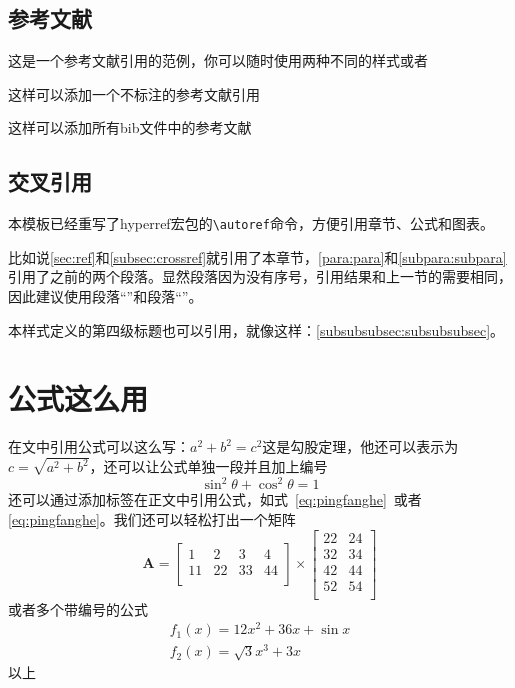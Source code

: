 \documentclass[supercite,gbtcite]{HustGraduPaper}
\begin{document}
	\subsection{参考文献}
	这是一个参考文献引用的范例\cite{Stone_1998}，你可以随时使用两种不同的样式或者\supercite{Stone_1998}
	
	这样可以添加一个不标注的参考文献引用\nocite{9787508342894}
	
	这样可以添加所有bib文件中的参考文献\nocite{*}
	
	\subsection{交叉引用}\label{subsec:crossref}
	本模板已经重写了hyperref宏包的\verb|\autoref|命令，方便引用章节、公式和图表。
	
	比如说\autoref{sec:ref}和\autoref{subsec:crossref}就引用了本章节，\autoref{para:para}和\autoref{subpara:subpara}引用了之前的两个段落。显然段落因为没有序号，引用结果和上一节的需要相同，因此建议使用段落“”和段落“”。
	
	本样式定义的第四级标题也可以引用，就像这样：\autoref{subsubsubsec:subsubsubsec}。
	
	
	
	\section{公式这么用}
	在文中引用公式可以这么写：$a^2+b^2=c^2$这是勾股定理，他还可以表示为$c=\sqrt{a^2+b^2}$，还可以让公式单独一段并且加上编号
	\begin{equation}
	\sin^2{\theta}+\cos^2{\theta}=1 \label{eq:pingfanghe}
	\end{equation}
	还可以通过添加标签在正文中引用公式，如式~\eqref{eq:pingfanghe}~或者\autoref{eq:pingfanghe}。我们还可以轻松打出一个矩阵
	\begin{equation}
	\bm{A}=\begin{bmatrix}
	1&2&3&4\\
	11&22&33&44\\
	\end{bmatrix}
	\times\begin{bmatrix}
	22&24\\
	32&34\\
	42&44\\
	52&54\\
	\end{bmatrix}
	\end{equation}
	或者多个带编号的公式
	\begin{eqnarray}
	f_1(x)=12x^2+36x+\sin x\\
	f_2(x)=\sqrt{3}{x^3+3x}
	\end{eqnarray}
	以上
	
\end{document}
